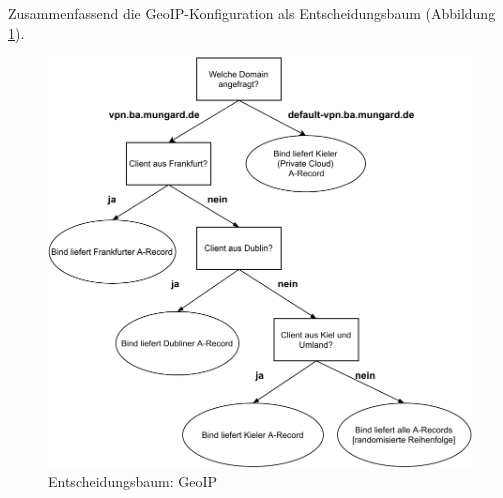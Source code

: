 Zusammenfassend die GeoIP-Konfiguration als Entscheidungsbaum (Abbildung \ref{grafik:Use-Case_2_Entscheidungsbaum_GeoIP}).
\begin{figure}[h]
  \centering
  \includegraphics{Figures/entscheidungsbaum_bind_geoip.pdf}
  \caption{Entscheidungsbaum: GeoIP}
  \label{grafik:Use-Case_2_Entscheidungsbaum_GeoIP}
\end{figure}\FloatBarrier

